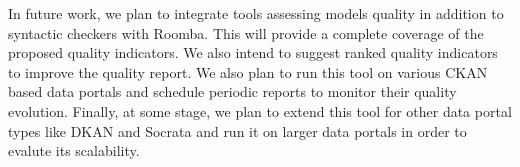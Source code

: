 \documentclass[onecolumn, crcready]{../../Tools/LaTEX/iosart2c}
\begin{document}
In future work, we plan to integrate tools assessing models quality in addition to syntactic checkers with Roomba. This will provide a complete coverage of the proposed quality indicators. We also intend to suggest ranked quality indicators to improve the quality report. We also plan to run this tool on various CKAN based data portals and schedule periodic reports to monitor their quality evolution. Finally, at some stage, we plan to extend this tool for other data portal types like DKAN and Socrata and run it on larger data portals in order to evalute its scalability.



\end{document}
